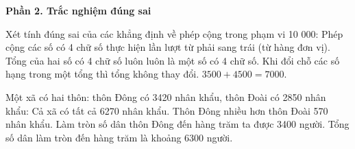 \textbf{Phần 2. Trắc nghiệm đúng sai}

\begin{ex} %
Xét tính đúng sai của các khẳng định về phép cộng trong phạm vi 10 000:
\choiceTF
{\True Phép cộng các số có 4 chữ số thực hiện lần lượt từ phải sang trái (từ hàng đơn vị).}
{Tổng của hai số có 4 chữ số luôn luôn là một số có 4 chữ số.}
{\True Khi đổi chỗ các số hạng trong một tổng thì tổng không thay đổi.}
{$3500 + 4500 = 7000$.}
\end{ex}

\begin{ex} %
Một xã có hai thôn: thôn Đông có 3420 nhân khẩu, thôn Đoài có 2850 nhân khẩu:
\choiceTF
{\True Cả xã có tất cả 6270 nhân khẩu.}
{\True Thôn Đông nhiều hơn thôn Đoài 570 nhân khẩu.}
{Làm tròn số dân thôn Đông đến hàng trăm ta được 3400 người.}
{\True Tổng số dân làm tròn đến hàng trăm là khoảng 6300 người.}
\end{ex}

